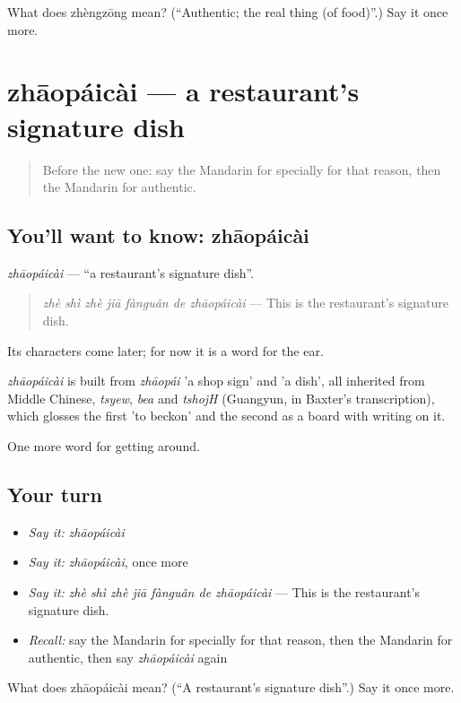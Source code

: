 \begin{tcolorbox}[breakable,colback=teal!4,colframe=teal!35!black,title={Before you move on}]
What does zhèngzōng mean? (\textquotedblleft{}Authentic; the real thing (of food)\textquotedblright{}.) Say it once more.
\end{tcolorbox}
\section[zhāopáicài]{zhāopáicài — a restaurant's signature dish}

\label{lesson:ZH-C450-zhaopaicai}



\begin{quote}
Before the new one: say the Mandarin for specially for that reason, then the Mandarin for authentic.
\end{quote}

\subsection*{You'll want to know: zhāopáicài}
\emph{zhāopáicài} — \textquotedblleft{}a restaurant's signature dish\textquotedblright{}.

\begin{quote}
\emph{zhè shì zhè jiā fànguǎn de zhāopáicài} — This is the restaurant's signature dish.
\end{quote}

Its characters come later; for now it is a word for the ear.

\begin{cousinweb}
\emph{zhāopáicài} is built from \emph{zhāopái} 'a shop sign' and  'a dish', all inherited from Middle Chinese, \emph{tsyew}, \emph{bea} and \emph{tshojH} (Guangyun, in Baxter's transcription), which glosses the first 'to beckon' and the second as a board with writing on it.
\end{cousinweb}

\begin{grammarlens}[title={What you've built}]
One more word for getting around.
\end{grammarlens}

\subsection*{Your turn}
\begin{itemize}
\raggedright
  \item \emph{Say it:} \emph{zhāopáicài}
  \item \emph{Say it:} \emph{zhāopáicài}, once more
  \item \emph{Say it:} \emph{zhè shì zhè jiā fànguǎn de zhāopáicài} — This is the restaurant's signature dish.
  \item \emph{Recall:} say the Mandarin for specially for that reason, then the Mandarin for authentic, then say \emph{zhāopáicài} again
\end{itemize}

\begin{tcolorbox}[breakable,colback=teal!4,colframe=teal!35!black,title={Before you move on}]
What does zhāopáicài mean? (\textquotedblleft{}A restaurant's signature dish\textquotedblright{}.) Say it once more.
\end{tcolorbox}
